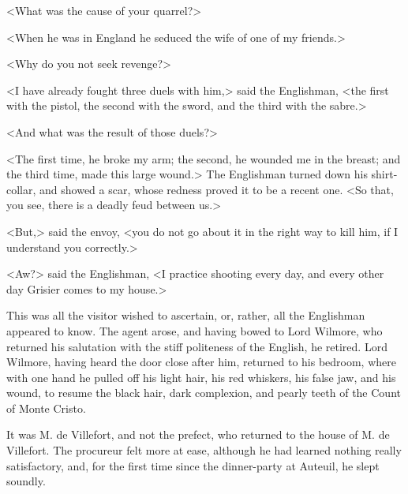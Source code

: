  <What was the cause of your quarrel?> 

 <When he was in England he seduced the wife of one of my friends.> 

 <Why do you not seek revenge?> 

 <I have already fought three duels with him,> said the Englishman, <the first with the pistol, the second with the sword, and the third with the sabre.> 

 <And what was the result of those duels?> 

 <The first time, he broke my arm; the second, he wounded me in the breast; and the third time, made this large wound.> The Englishman turned down his shirt-collar, and showed a scar, whose redness proved it to be a recent one. <So that, you see, there is a deadly feud between us.> 

 <But,> said the envoy, <you do not go about it in the right way to kill him, if I understand you correctly.> 

 <Aw?> said the Englishman, <I practice shooting every day, and every other day Grisier comes to my house.> 

 This was all the visitor wished to ascertain, or, rather, all the Englishman appeared to know. The agent arose, and having bowed to Lord Wilmore, who returned his salutation with the stiff politeness of the English, he retired. Lord Wilmore, having heard the door close after him, returned to his bedroom, where with one hand he pulled off his light hair, his red whiskers, his false jaw, and his wound, to resume the black hair, dark complexion, and pearly teeth of the Count of Monte Cristo. 

 It was M. de Villefort, and not the prefect, who returned to the house of M. de Villefort. The procureur felt more at ease, although he had learned nothing really satisfactory, and, for the first time since the dinner-party at Auteuil, he slept soundly. 
